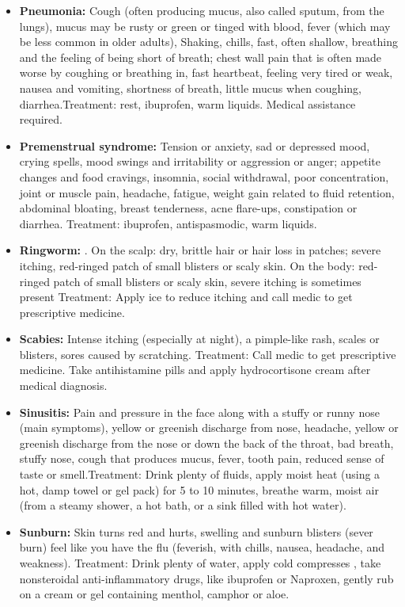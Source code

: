\begin{itemize}
\item \textbf{Pneumonia:} Cough (often producing mucus, also called sputum, from the lungs), mucus may be rusty or green or tinged with blood, fever (which may be less common in older adults), Shaking,  chills, fast, often shallow, breathing and the feeling of being short of breath; chest wall pain that is often made worse by coughing or breathing in, fast heartbeat, feeling very tired or weak, nausea and vomiting, shortness of breath, little mucus when coughing, diarrhea.Treatment: rest, ibuprofen, warm liquids. Medical assistance required.

\item \textbf{Premenstrual syndrome:} Tension or anxiety, sad or depressed mood, crying spells, mood swings and irritability or aggression or anger; appetite changes and food cravings, insomnia, social withdrawal, poor concentration, joint or muscle pain, headache, fatigue, weight gain related to fluid retention, abdominal bloating, breast tenderness, acne flare-ups, constipation or diarrhea. Treatment: ibuprofen, antispasmodic, warm liquids.

\item \textbf{Ringworm: }. On the scalp: dry, brittle hair or hair loss in patches; severe itching, red-ringed patch of small blisters or scaly skin. On the body: red-ringed patch of small blisters or scaly skin, severe itching is sometimes present Treatment: Apply ice to reduce itching and call medic to get prescriptive medicine.

\item \textbf{Scabies:} Intense itching (especially at night), a pimple-like rash, scales or blisters, sores caused by scratching. Treatment: Call medic to get prescriptive medicine. Take antihistamine pills and apply hydrocortisone cream after medical diagnosis.

\item \textbf{Sinusitis:} Pain and pressure in the face along with a stuffy or runny nose (main symptoms), yellow or greenish discharge from nose, headache, yellow or greenish discharge from the nose or down the back of the throat, bad breath, stuffy nose, cough that produces mucus, fever, tooth pain, reduced sense of taste or smell.Treatment: Drink plenty of fluids, apply moist heat (using a hot, damp towel or gel pack) for 5 to 10 minutes, breathe warm, moist air (from a steamy shower, a hot bath, or a sink filled with hot water).

\item \textbf{Sunburn:} Skin turns red and hurts, swelling and sunburn blisters (sever burn) feel like you have the flu (feverish, with chills, nausea, headache, and weakness). Treatment: Drink plenty of water, apply cold compresses , take nonsteroidal anti-inflammatory drugs, like ibuprofen or Naproxen, gently rub on a cream or gel containing menthol, camphor or aloe.


\end{itemize}
